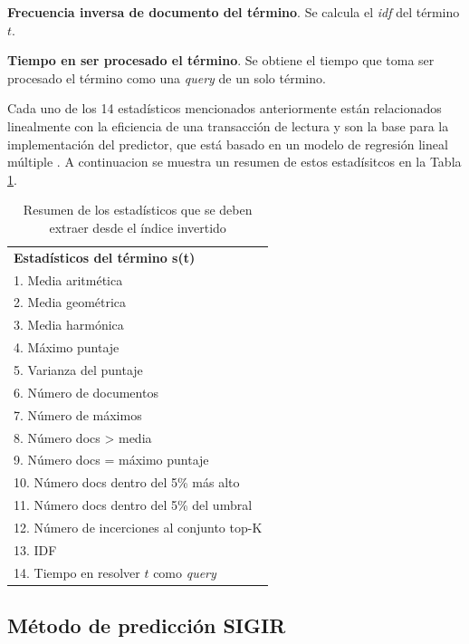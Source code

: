 \begin{list}{}{}
	\item \textbf{Frecuencia inversa de documento del término}. Se calcula el \textit{idf} del término $t$.
	
	\item \textbf{Tiempo en ser procesado el término}. Se obtiene el tiempo que toma ser procesado el término como una \textit{query} de un solo término.

\end{list}


Cada uno de los 14 estadísticos mencionados anteriormente están relacionados linealmente con la eficiencia de una transacción de lectura y son la base para la implementación del predictor, que está basado en un modelo de regresión lineal múltiple \citep{Chambers:1991}. A continuacion se muestra un resumen de estos estadísitcos en la Tabla \ref{tabla:estadisticosGlasgow}. 

\begin{table}[H]
\centering
\caption{Resumen de los estadísticos que se deben extraer desde el índice invertido}
\label{tabla:estadisticosGlasgow}
\begin{tabular}{|l|}
	\hline
	\textbf{Estadísticos del término s(t)} \\	
	1. Media aritmética	 \\ \hline
	2. Media geométrica	 \\ \hline
	3. Media harmónica	 \\ \hline
	4. Máximo puntaje	 \\ \hline
	5. Varianza del puntaje	 \\ \hline
	6. Número de documentos	 \\ \hline
	7. Número de máximos	 \\ \hline
	8. Número docs > media	 \\ \hline
	9. Número docs = máximo puntaje	 \\ \hline
	10. Número docs dentro del 5\% más alto	 \\ \hline
	11. Número docs dentro del 5\% del umbral	 \\ \hline
	12. Número de incerciones al conjunto top-K	 \\ \hline
	13. IDF	 \\ \hline
	14. Tiempo en resolver $t$ como \textit{query}	\\ \hline  
\end{tabular}
\end{table}


\subsection{Método de predicción SIGIR}
\label{scheduling:sigir}

